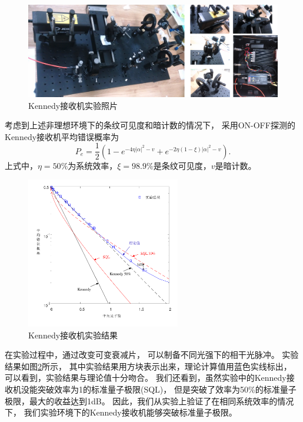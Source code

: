 \begin{figure}
\centering
  \includegraphics[width=\textwidth]{figures/chap5/experiment-photo}
  \caption{Kennedy接收机实验照片}
  \label{fig:experiment-photo}
\end{figure}

考虑到上述非理想环境下的条纹可见度和暗计数的情况下，
采用ON-OFF探测的Kennedy接收机平均错误概率为
\begin{equation}
P_e = \frac{1}{2}(1-e^{- 4 \eta |\alpha|^2 - v} + e^{- 2 \eta (1-\xi) |\alpha|^2 - v }).
\end{equation}
上式中，$\eta=50\%$为系统效率，$\xi=98.9\%$是条纹可见度，$v$是暗计数。

\begin{figure}[H]
\centering
  \includegraphics[width=0.6\textwidth]{figures/chap5/kennedy-experiment-error}
  \caption{Kennedy接收机实验结果}
  \label{fig:kennedy-experiment-error}
\end{figure}


在实验过程中，通过改变可变衰减片，
可以制备不同光强下的相干光脉冲。
实验结果如图\ref{fig:kennedy-experiment-error}所示，
其中实验结果用方块表示出来，理论计算值用蓝色实线标出，
可以看到，实验结果与理论值十分吻合。
我们还看到，虽然实验中的Kennedy接收机没能突破效率为1的标准量子极限(SQL)，
但是突破了效率为50\%的标准量子极限，最大的收益达到1dB。
因此，我们从实验上验证了在相同系统效率的情况下，
我们实验环境下的Kennedy接收机能够突破标准量子极限。





